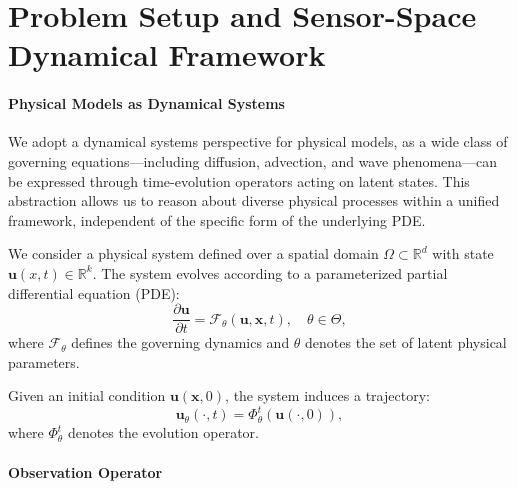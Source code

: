


\section{Problem Setup and Sensor-Space Dynamical Framework}

\paragraph{Physical Models as Dynamical Systems}

We adopt a dynamical systems perspective for physical models, as a wide class of governing equations---including diffusion, advection, and wave phenomena---can be expressed through time-evolution operators acting on latent states. This abstraction allows us to reason about diverse physical processes within a unified framework, independent of the specific form of the underlying PDE.

We consider a physical system defined over a spatial domain $\Omega \subset \mathbb{R}^d$ with state $\mathbf{u}(x,t) \in \mathbb{R}^k$. The system evolves according to a parameterized partial differential equation (PDE):
\begin{equation}
\frac{\partial \mathbf{u}}{\partial t} = \mathcal{F}_\theta(\mathbf{u}, \mathbf{x}, t), \quad \theta \in \Theta,
\end{equation}
where $\mathcal{F}_\theta$ defines the governing dynamics and $\theta$ denotes the set of latent physical parameters.

Given an initial condition $\mathbf{u}(\mathbf{x},0)$, the system induces a trajectory:
\begin{equation}
\mathbf{u}_\theta(\cdot, t) = \Phi_\theta^t(\mathbf{u}(\cdot,0)),
\end{equation}
where $\Phi_\theta^t$ denotes the evolution operator.

\paragraph{Observation Operator}

